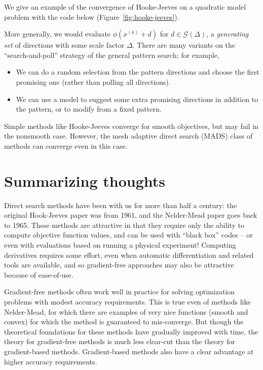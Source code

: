 \documentclass[12pt, leqno]{article} %
\providecommand{\tightlist}{%
  \setlength{\itemsep}{0pt}\setlength{\parskip}{0pt}}
\begin{document}
We give an example of the convergence of Hooke-Jeeves on a quadratic model
problem with the code below (Figure~\ref{fig:hooke-jeeves}).

More generally, we would evaluate \(\phi(x^{(k)} + d)\) for
\(d \in \mathcal{G}(\Delta)\), a \emph{generating set} of directions
with some scale factor \(\Delta\). There are many variants on the
``search-and-poll'' strategy of the general pattern search; for example,

\begin{itemize}
\tightlist
\item
  We can do a random selection from the pattern directions and choose
  the first promising one (rather than polling all directions).
\item
  We can use a model to suggest some extra promising directions in
  addition to the pattern, or to modify from a fixed pattern.
\end{itemize}

Simple methods like Hooke-Jeeves converge for smooth objectives, but may
fail in the nonsmooth case. However, the mesh adaptive direct search
(MADS) class of methods can converge even in this case.

\section{Summarizing thoughts}

Direct search methods have been with us for more than half a century:
the original Hook-Jeeves paper was from 1961, and the Nelder-Mead paper
goes back to 1965. These methods are attractive in that they require
only the ability to compute objective function values, and can be used
with ``black box'' codes -- or even with evaluations based on running a
physical experiment! Computing derivatives requires some effort, even
when automatic differentiation and related tools are available, and so
gradient-free approaches may also be attractive because of ease-of-use.

Gradient-free methods often work well in practice for solving
optimization problems with modest accuracy requirements. This is true
even of methods like Nelder-Mead, for which there are examples of very
nice functions (smooth and convex) for which the method is guaranteed to
mis-converge. But though the theoretical foundations for these methods
have gradually improved with time, the theory for gradient-free methods
is much less clear-cut than the theory for gradient-based methods.
Gradient-based methods also have a clear advantage at higher accuracy
requirements.
\end{document}
